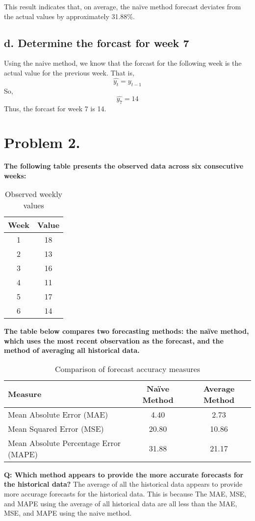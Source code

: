 \documentclass{report}
\begin{document}
\noindent This result indicates that, on average, the naïve method forecast deviates from the actual values by approximately 31.88\%.
\subsection*{d. Determine the forcast for week 7}
Using the naive method, we know that the forcast for the following week is the actual value for the previous week. That is,
$$ \hat{y_t} = y_{t-1}$$
So,
$$ \hat{y_7} = 14$$
Thus, the forcast for week 7 is 14.
\newpage
\section{Problem 2.}

\textbf{The following table presents the observed data across six consecutive weeks:}

\begin{table}[ht]
\centering
\begin{tabular}{@{}cS[table-format=2.0]@{}} 
\toprule 
{Week} & {Value} \\ 
 & 18 \\
2 & 13 \\
3 & 16 \\
4 & 11 \\
5 & 17 \\
6 & 14 \\
\bottomrule
\end{tabular}
\caption{Observed weekly values}
\label{tab:observed_data}
\end{table}
\noindent \textbf{The table below compares two forecasting methods: the naïve method, which uses the most recent observation as the forecast, and the method of averaging all historical data.}

\begin{table}[ht]
\centering
\begin{tabular}{@{}lS[table-format=2.2]S[table-format=2.2]@{}} 
\toprule
{Measure} & {\textbf{Naïve Method}} & {\textbf{Average Method}} \\
\midrule
Mean Absolute Error (MAE) & 4.40 & 2.73 \\
Mean Squared Error (MSE) & 20.80 & 10.86 \\
Mean Absolute Percentage Error (MAPE) & 31.88 & 21.17 \\
\bottomrule
\end{tabular}
\caption{Comparison of forecast accuracy measures}
\label{tab:forecast_comparison}
\end{table}
\noindent \textbf{Q: Which method appears to provide the more accurate forecasts for the historical data?}
\bigbreak \noindent
The average of all the historical data appears to provide more accurage forecasts for the historical data. This is because The MAE, MSE, and MAPE using the average of all historical data are all less than the MAE, MSE, and MAPE using the naive method.
\end{document}
